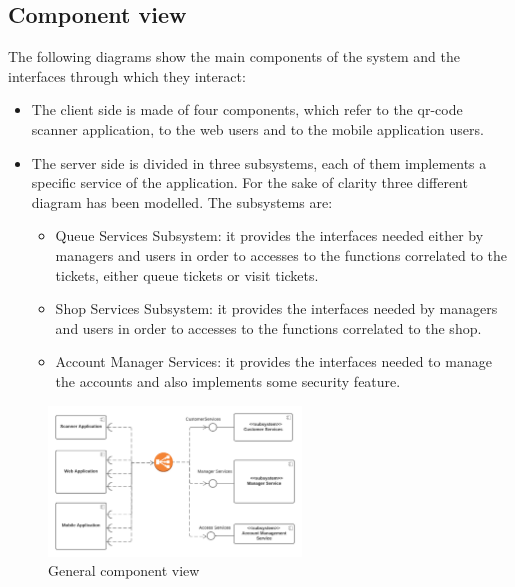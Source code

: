 \subsection{Component view}
\label{subsect:componentview}
The following diagrams show the main components of the system and the interfaces through which they interact:
\begin{itemize}
    \item The client side is made of four components, which refer to the qr-code scanner application, to the web users and to the mobile application users.
    \item The server side is divided in three subsystems, each of them implements a specific service of the application. For the sake of clarity three different diagram has been modelled. The subsystems are:
    \begin{itemize}
        \item Queue Services Subsystem: it provides the interfaces needed either by managers and users in order to accesses to the functions correlated to the tickets, either queue tickets or visit tickets.
        \item Shop Services Subsystem: it provides the interfaces needed by managers and users in order to accesses to the functions correlated to the shop.
        \item Account Manager Services: it provides the interfaces needed to manage the accounts and also implements some security feature.
    \end{itemize}
\end{itemize}
\begin{figure}[h!]
    \centering
    \includegraphics[width=0.6\textwidth]{Images/ComponentViewHighLevel.png}
    \caption{\label{fig:ComponentViewHighLevel}{General component view}}
\end{figure}

